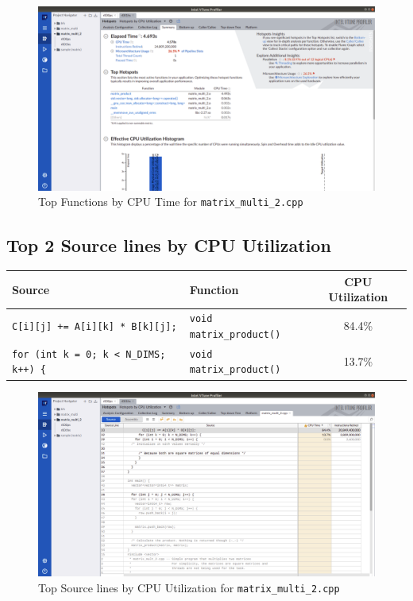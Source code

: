 \documentclass[11pt, swedish, openany]{book}
\begin{document}
\begin{figure}[H]
    \centering
    \includegraphics[scale=0.25]{vtune/matrix_multi_2/hs.png}
    \caption{Top Functions by CPU Time for \texttt{matrix\_multi\_2.cpp}}
\end{figure}

\newpage
\subsection*{Top 2 Source lines by CPU Utilization}
\begin{table}[H]
    \begin{tabular}{||l|l||c||}
        \hline
        Source                                        & Function                        & CPU Utilization \\
        \hline
        \texttt{C[i][j] += A[i][k] * B[k][j];}        & \texttt{void matrix\_product()} & 84.4\%          \\
        \texttt{for (int k = 0; k < N\_DIMS; k++) \{} & \texttt{void matrix\_product()} & 13.7\%          \\
        \hline
    \end{tabular}
\end{table}

\begin{figure}[H]
    \centering
    \includegraphics[scale=0.25]{vtune/matrix_multi_2/sc.png}
    \caption{Top Source lines by CPU Utilization for \texttt{matrix\_multi\_2.cpp}}
\end{figure}
\end{document}

